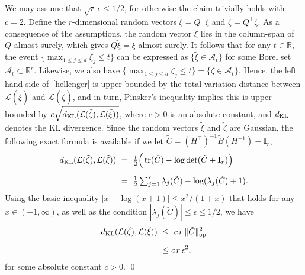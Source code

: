 \documentclass[aos,preprint]{imsart}
\numberwithin{equation}{section}
\theoremstyle{plain}
\newcommand{\R}{\mathbb{R}}
\renewcommand{\L}{\mathcal{L}}
\newcommand{\e}{\epsilon}
\newcommand{\tr}{\operatorname{tr}}
\newcommand{\ttop}{^{\top}}
\newcommand{\op}{_{\textup{op}}}
\newcommand{\ts}{\textstyle}
\newcommand{\1}{{\bf{1}}}
\newcommand{\0}{\mathbf{0}}
\begin{document}
\proof 
We may assume that $\sqrt{r} \,\e\leq 1/2$, for otherwise the claim trivially holds with $c=2$. Define the $r$-dimensional random vectors $\tilde \xi=Q\ttop  \xi$ and $\tilde \zeta=Q\ttop \zeta$. As a consequence of the assumptions, the random vector $\xi$ lies in the column-span of $Q$ almost surely, which gives $Q\tilde \xi=\xi$ almost surely. It follows that for any $t\in\R$, the event $\{\max_{1\leq j\leq d} \xi_j \leq t\}$ can be expressed as $\{\tilde \xi\in\mathcal{A}_t\}$ for some Borel set $\mathcal{A}_t\subset \R^r$. Likewise, we also have  $\{\max_{1\leq j\leq d} \zeta_j \leq t\} = \{\tilde \zeta\in\mathcal{A}_t\}$. Hence, the left hand side of~\eqref{hellenger} is upper-bounded by the total variation distance between $\L(\tilde \xi)$ and $\L(\tilde \zeta)$, and in turn, Pinsker's inequality implies this is upper-bounded by $c\sqrt{d_{\textup{KL}}(\L(\tilde \zeta),\L(\tilde \xi))}$, where $c>0$ is an absolute constant, and $d_{\textup{KL}}$ denotes the KL divergence. Since the random vectors $\tilde \xi$ and $\tilde \zeta$ are Gaussian, the following exact formula is available if we let $\tilde C=(H\ttop)^{-1}\tilde B(H^{-1})-\mathbf{I}_r$, 
\begin{equation}
\begin{split}
 d_{\textup{KL}}(\L(\tilde \zeta),\L(\tilde \xi)) & \ = \ \ts\frac{1}{2}\Big(\tr(\tilde C)-\log\det(\tilde C+\mathbf{I}_r)\Big)\\[0.2cm]
 & \ = \ \ts\frac{1}{2}\sum_{j=1}^r \lambda_j(\tilde C)-\log(\lambda_j(\tilde C)+1).
 \end{split}
\end{equation}
Using the basic inequality  $|x-\log(x+1)|\leq x^2/(1+x)$ that holds for any $x\in(-1,\infty)$, as well as the condition $|\lambda_j(\tilde C)|\leq \e\leq 1/2$, we have
\begin{equation}
\begin{split}
 d_{\textup{KL}}(\L(\tilde \zeta),\L(\tilde \xi)) & \ \leq \ c \, r\, \|\tilde C\|\op^2\\[0.2cm]
 & \ \leq c \, r \, \e^2,
 \end{split}
\end{equation}
for some absolute constant $c>0$. \qed
\end{document}
